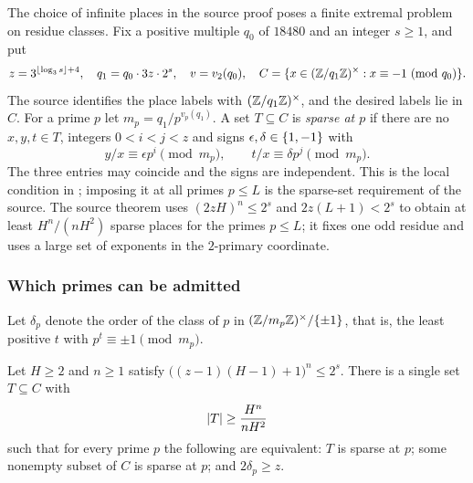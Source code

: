 The choice of infinite places in the source proof poses a finite extremal problem on
residue classes. Fix a positive multiple $q_0$ of $18480$ and an integer $s\ge1$, and put
\[
 z=3^{\lfloor\log_3s\rfloor+4},\quad q_1=q_0\cdot3z\cdot2^s,\quad v=v_2(q_0),\quad
 C=\{x\in(\mathbb{Z}/q_1\mathbb{Z})^\times:x\equiv-1\ (\mathrm{mod}\ q_0)\} .
\]
The source identifies the place labels with $(\mathbb{Z}/q_1\mathbb{Z})^\times$, and the desired labels
lie in $C$. For a prime $p$ let $m_p=q_1/p^{v_p(q_1)}$. A set $T\subseteq C$ is
\emph{sparse at $p$} if there are no $x,y,t\in T$, integers $0<i<j<z$ and signs
$\epsilon,\delta\in\{1,-1\}$ with
\[
 y/x\equiv\epsilon p^i\pmod{m_p},\qquad t/x\equiv\delta p^j\pmod{m_p}.
\]
The three entries may coincide and the signs are independent. This is the local
condition in ; imposing it at all primes $p\le L$ is the
sparse-set requirement of the source. The source theorem
 uses $(2zH)^n\le2^s$ and $2z(L+1)<2^s$ to obtain
at least $H^n/(nH^2)$ sparse places for the primes $p\le L$; it fixes one odd residue and
uses a large set of exponents in the $2$-primary coordinate.

\subsubsection*{Which primes can be admitted}

Let $\delta_p$ denote the order of the class of $p$ in $(\mathbb{Z}/m_p\mathbb{Z})^\times/\{\pm1\}$,
that is, the least positive $t$ with $p^t\equiv\pm1\pmod{m_p}$.

\begin{theorem}\label{gpp:thm:sparseexact}
Let $H\ge2$ and $n\ge1$ satisfy $\bigl((z-1)(H-1)+1\bigr)^n\le2^s$. There is a single set
$T\subseteq C$ with
\[
 \lvert T\rvert\ge\frac{H^n}{nH^2}
\]
such that for every prime $p$ the following are equivalent: $T$ is sparse at $p$; some
nonempty subset of $C$ is sparse at $p$; and $2\delta_p\ge z$.
\end{theorem}

